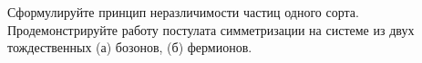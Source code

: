 \documentclass[__main__.tex]{subfiles}
\begin{document}
Сформулируйте принцип неразличимости частиц одного сорта. Продемонстрируйте работу постулата симметризации на системе из двух тождественных (а) бозонов, (б) фермионов.\\ 

\end{document}
